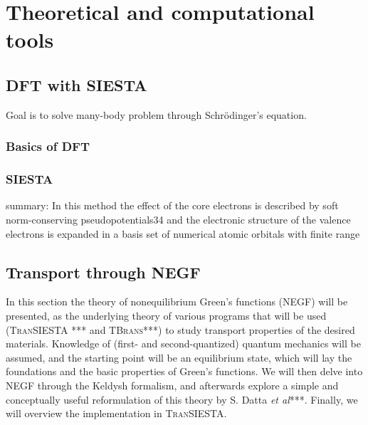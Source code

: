 
\chapter{Theoretical and computational tools} %

\label{Chapter1} %


\newcommand{\keyword}[1]{\textbf{#1}}
\newcommand{\tabhead}[1]{\textbf{#1}}
\newcommand{\code}[1]{\texttt{#1}}
\newcommand{\file}[1]{\texttt{\bfseries#1}}
\newcommand{\option}[1]{\texttt{\itshape#1}}

\section{DFT with SIESTA}
Goal is to solve many-body problem through Schrödinger's equation.
\subsection{Basics of DFT}
\subsection{SIESTA}
summary: In this method the effect of
the core electrons is described by soft norm-conserving
pseudopotentials34 and the electronic structure of the valence
electrons is expanded in a basis set of numerical atomic orbitals with finite range

\section{Transport through NEGF}

In this section the theory of nonequilibrium Green's functions (NEGF) will be presented, as the underlying theory of various programs that will be used (\textsc{TranSIESTA} *** and \textsc{TBrans}***) to study transport properties of the desired materials. Knowledge of (first- and second-quantized) quantum mechanics  will be assumed, and the starting point will be an equilibrium state, which will lay the foundations and the basic properties of Green's functions. We will then delve into NEGF through the Keldysh formalism, and afterwards explore a simple and conceptually useful reformulation of this theory by S. Datta \textit{et al}***. Finally, we will overview the implementation in \textsc{TranSIESTA}.


